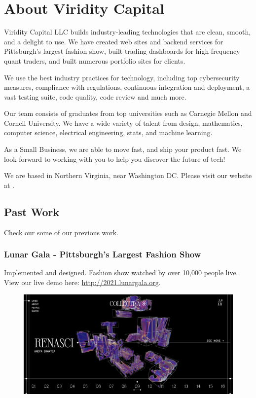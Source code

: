 
\section{About Viridity Capital}

Viridity Capital LLC builds industry-leading technologies that are clean,
smooth, and a delight to use. We have created web sites and backend services
for Pittsburgh's largest fashion show, built trading dashboards for
high-frequency quant traders, and built numerous portfolio sites for clients.

We use the best industry practices for technology, including top cybersecurity
measures, compliance with regulations, continuous integration and deployment, a
vast testing suite, code quality, code review and much more.

Our team consists of graduates from top universities such as Carnegie Mellon
and Cornell University. We have a wide variety of talent from design,
mathematics, computer science, electrical engineering, stats, and machine
learning.

As a Small Business, we are able to move fast, and ship your product fast. We
look forward to working with you to help you discover the future of tech!

We are based in Northern Virginia, near Washington DC. Please visit our website
at \href{\website}{\website}.

\subsection{Past Work}
\label{past_work}

Check our some of our previous work.

\subsubsection{Lunar Gala - Pittsburgh's Largest Fashion Show}

Implemented and designed. Fashion show watched by over 10,000 people live. 
View our live demo here: \href{http://2021.lunargala.org/}{http://2021.lunargala.org}. \vspace{12pt}

\begin{figure}[H]
  \centering
  \includegraphics[width=\textwidth]{lunargala.jpg}
\end{figure}

